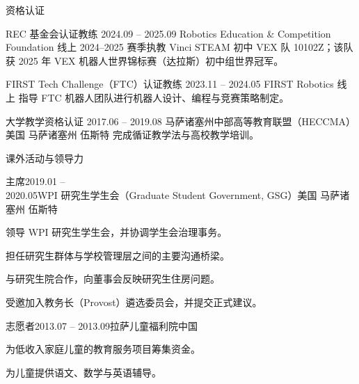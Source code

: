 \documentclass{resume}
\begin{document}
\begin{rSection}{资格认证}

\begin{hSubsection}
{REC 基金会认证教练}
{2024.09 -- 2025.09}
{Robotics Education \& Competition Foundation}
{线上}
{2024--2025 赛季执教 Vinci STEAM 初中 VEX 队 10102Z；该队获 2025 年 VEX 机器人世界锦标赛（达拉斯）初中组世界冠军。}
\end{hSubsection}

\begin{hSubsection}
{FIRST Tech Challenge（FTC）认证教练}
{2023.11 -- 2024.05}
{FIRST Robotics}
{线上}
{指导 FTC 机器人团队进行机器人设计、编程与竞赛策略制定。}
\end{hSubsection}

\begin{hSubsection}
{大学教学资格认证}
{2017.06 -- 2019.08}
{马萨诸塞州中部高等教育联盟（HECCMA）}
{美国 马萨诸塞州 伍斯特}
{完成循证教学法与高校教学培训。}
\end{hSubsection}

\end{rSection}

\begin{rSection}{课外活动与领导力}

\begin{rSubsection}{主席}{2019.01 -- 2020.05}{WPI 研究生学生会（Graduate Student Government, GSG）}{美国 马萨诸塞州 伍斯特}
\item 领导 WPI 研究生学生会，并协调学生会治理事务。
\item 担任研究生群体与学校管理层之间的主要沟通桥梁。
\item 与研究生院合作，向董事会反映研究生住房问题。
\item 受邀加入教务长（Provost）遴选委员会，并提交正式建议。
\end{rSubsection}

\begin{rSubsection}{志愿者}{2013.07 -- 2013.09}{拉萨儿童福利院}{中国}
\item 为低收入家庭儿童的教育服务项目筹集资金。
\item 为儿童提供语文、数学与英语辅导。
\end{rSubsection}

\end{rSection}
\end{document}
